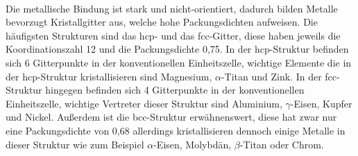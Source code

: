 \documentclass[11pt,a4paper]{article}
\numberwithin{equation}{section}
\numberwithin{figure}{section}
\begin{document}
\\
\begin{addmargin}[25pt]{0pt}     
Die metallische Bindung ist stark und nicht-orientiert, dadurch bilden Metalle bevorzugt Kristallgitter aus, welche hohe Packungsdichten aufweisen. Die häufigsten Strukturen sind das hcp- und das fcc-Gitter, diese haben jeweils die Koordinationszahl 12 und die Packungsdichte 0,75. In der hcp-Struktur befinden sich 6 Gitterpunkte in der konventionellen Einheitszelle, wichtige Elemente die in der hcp-Struktur kristallisieren sind Magnesium, $\alpha$-Titan und Zink. In der fcc-Struktur hingegen befinden sich 4 Gitterpunkte in der konventionellen Einheitszelle, wichtige Vertreter dieser Struktur sind Aluminium, $\gamma$-Eisen, Kupfer und Nickel. Außerdem ist die bcc-Struktur erwähnenswert, diese hat zwar nur eine Packungsdichte von 0,68 allerdings kristallisieren dennoch einige Metalle in dieser Struktur wie zum Beispiel $\alpha$-Eisen, Molybdän, $\beta$-Titan oder Chrom. \\
\end{addmargin}
\end{document}
